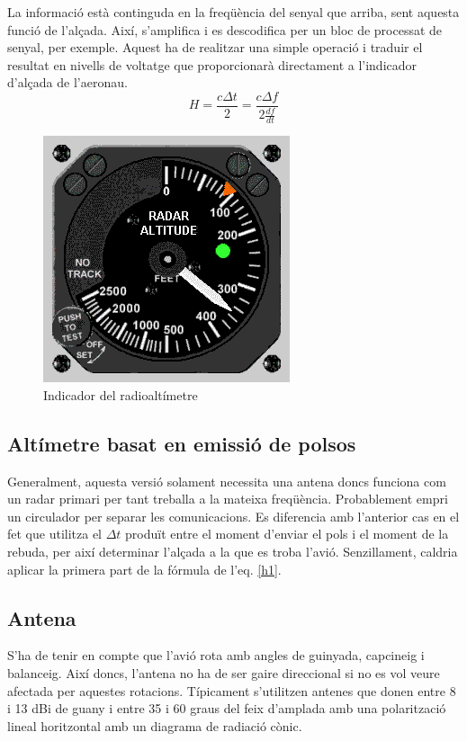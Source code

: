 La informació està continguda en la freqüència del senyal que arriba, sent aquesta funció de l'alçada. Així, s'amplifica i  es descodifica   per un bloc de processat de senyal, per exemple. Aquest ha de realitzar una simple operació i traduir el resultat en nivells de voltatge que proporcionarà directament a l'indicador d'alçada de l'aeronau.
\begin{equation}
\label{h1}
H=\frac{c\Delta t}{2}=\frac{c\Delta f}{2\frac{df}{dt}}
\end{equation}
\begin{figure}[H]
	\centering
	\includegraphics[scale=0.4]{./img/panel}
	\caption{Indicador del radioaltímetre}
\end{figure}
\subsection{Altímetre basat en emissió de polsos}
Generalment, aquesta versió solament necessita una antena doncs funciona com un radar primari  per tant treballa a la mateixa freqüència. Probablement empri un circulador per separar les comunicacions. Es diferencia amb l'anterior cas en el fet que utilitza el $\Delta t$ produït entre el moment d'enviar el pols i el moment de la rebuda, per així determinar l'alçada a la que es troba l'avió. Senzillament, caldria aplicar la primera part de la fórmula de l'eq. \ref{h1}.

\subsection{Antena}
S'ha de tenir en compte  que l'avió rota amb angles de guinyada, capcineig i balanceig. Així doncs, l'antena no ha de ser gaire direccional si no es vol veure afectada per aquestes rotacions. Típicament s'utilitzen antenes que donen entre 8 i 13 dBi de guany i entre 35 i 60 graus del feix d'amplada amb una polarització lineal horitzontal amb un diagrama de radiació cònic.

